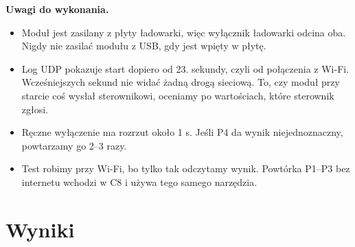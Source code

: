 \documentclass[11pt,a4paper]{article}
\begin{document}
\textbf{Uwagi do wykonania.}


\begin{itemize}
\item Moduł jest zasilany z płyty ładowarki, więc wyłącznik ładowarki odcina oba. Nigdy nie zasilać modułu z USB, gdy jest wpięty w płytę.
\item Log UDP pokazuje start dopiero od 23. sekundy, czyli od połączenia z Wi-Fi. Wcześniejszych sekund nie widać żadną drogą sieciową. To, czy moduł przy starcie coś wysłał sterownikowi, oceniamy po wartościach, które sterownik zgłosi.
\item Ręczne wyłączenie ma rozrzut około 1 s. Jeśli P4 da wynik niejednoznaczny, powtarzamy go 2–3 razy.
\item Test robimy przy Wi-Fi, bo tylko tak odczytamy wynik. Powtórka P1–P3 bez internetu wchodzi w C8 i używa tego samego narzędzia.
\end{itemize}

\section*{Wyniki}
\end{document}
